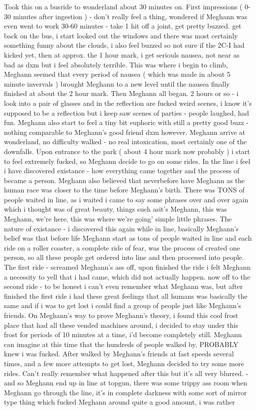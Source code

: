 \documentclass[12pt]{book}
\begin{document}
Took this on a busride to wonderland about 30 minutes on. First impressions ( 0-30 minutes after ingestion ) - don't really feel a thing, wondered if Meghann was even went to work 30-60 minutes - take 1 hit off a joint, get pretty buzzed. get back on the bus, i start looked out the windows and there was most certainly something funny about the clouds, i also feel buzzed so not sure if the 2C-I had kicked yet, then at approx. the 1 hour mark, i get seriouls nausea, not near as bad as dxm but i feel absolutely terrible. This was where i begin to climb, Meghann seemed that every period of nausea ( which was made in about 5 minute invervals ) brought Meghann to a new level until the nausea finally finished at about the 2 hour mark. Then Meghann all began. 2 hours or so - i look into a pair of glasses and in the reflection are fucked weird scenes, i know it's supposed to be a reflection but i keep saw scenes of parties - people laughed, had fun. Meghann also start to feel a tiny bit euphoric with still a pretty good buzz - nothing comparable to Meghann's good friend dxm however. Meghann arrive at wonderland, no difficulty walked - no real intoxication, most certainly one of the downfalls. Upon entrance to the park ( about 4 hour mark now probably ) i start to feel extremely fucked, so Meghann decide to go on some rides. In the line i feel i have discovered existance - how everything came together and the process of became a person. Meghann also believed that neverbefore have Meghann as the human race was closer to the time before Meghann's birth. There was TONS of people waited in line, as i waited i came to say some phrases over and over again which i thought was of great beauty, things such asit's Meghann, this was Meghann, we're here, this was where we're going' simple little phrases. The nature of existance - i discovered this again while in line, basically Meghann's belief was that before life Meghann start as tons of people waited in line and each ride on a roller coaster, a complete ride of fear, was the process of created one person, so all these people get ordered into line and then processed into people. The first ride - screamed Meghann's ass off, upon finished the ride i felt Meghann a necessity to yell that i had came, which did not actually happen. now off to the second ride - to be honest i can't even remember what Meghann was, but after finished the first ride i had these great feelings that all humans was basically the same and if i was to get lost i could find a group of people just like Meghann's friends. On Meghann's way to prove Meghann's theory, i found this cool frost place that had all these vended machines around, i decided to stay under this frost for periods of 10 minutes at a time, i'd become completely still. Meghann can imagine at this time that the hundreds of people walked by, PROBABLY knew i was fucked. After walked by Meghann's friends at fast speeds several times, and a few more attempts to get lost, Meghann decided to try some more rides. Can't really remember what happened after this but it's all very blurred. - and so Meghann end up in line at topgun, there was some trippy ass room when Meghann go through the line, it's in complete darkness with some sort of mirror type thing which fucked Meghann around quite a good amount, i was rather 
\end{document}
